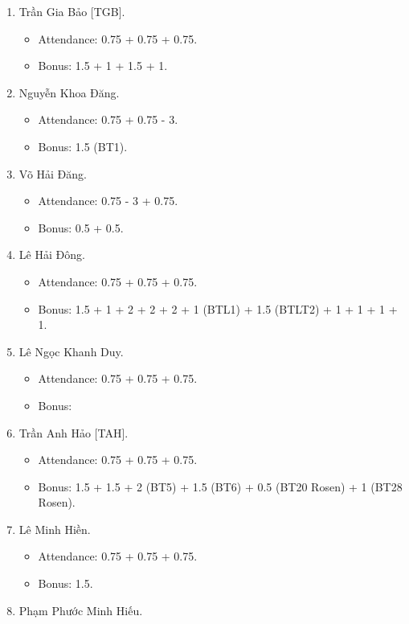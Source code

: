 \documentclass{article}
\begin{document}
\begin{enumerate}
    \item {\sc Trần Gia Bảo [TGB].}
    \begin{itemize}
        \item Attendance: 0.75 + 0.75 + 0.75.
        \item Bonus: 1.5 + 1 + 1.5 + 1.
    \end{itemize}
    \item {\sc Nguyễn Khoa Đăng.}
    \begin{itemize}
        \item Attendance: 0.75 + 0.75 - 3.
        \item Bonus: 1.5 (BT1).
    \end{itemize}
    \item {\sc Võ Hải Đăng.}
    \begin{itemize}
        \item Attendance: 0.75 - 3 + 0.75.
        \item Bonus: 0.5 + 0.5.
    \end{itemize}
    \item {\sc Lê Hải Đông.}
    \begin{itemize}
        \item Attendance: 0.75 + 0.75 + 0.75.
        \item Bonus: 1.5 + 1 + 2 + 2 + 2 + 1 (BTL1) + 1.5 (BTLT2) + 1 + 1 + 1 + 1.
    \end{itemize}
    \item {\sc Lê Ngọc Khanh Duy.}
    \begin{itemize}
        \item Attendance: 0.75 + 0.75 + 0.75.
        \item Bonus:
    \end{itemize}
    \item {\sc Trần Anh Hảo [TAH].}
    \begin{itemize}
        \item Attendance: 0.75 + 0.75 + 0.75.
        \item Bonus: 1.5 + 1.5 + 2 (BT5) + 1.5 (BT6) + 0.5 (BT20 Rosen) + 1 (BT28 Rosen).
    \end{itemize}
    \item {\sc Lê Minh Hiền.}
    \begin{itemize}
        \item Attendance: 0.75 + 0.75 + 0.75.
        \item Bonus: 1.5.
    \end{itemize}
    \item {\sc Phạm Phước Minh Hiếu.}

\end{enumerate}
\end{document}
